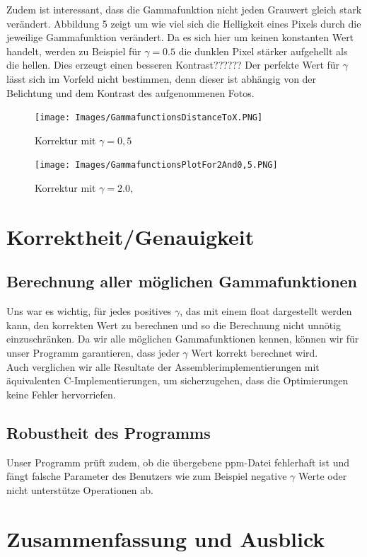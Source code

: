 \documentclass[course=erap]{aspdoc}
\begin{document}
	\noindent
	Zudem ist interessant, dass die Gammafunktion nicht jeden Grauwert gleich stark verändert. Abbildung 5 zeigt um wie viel sich die Helligkeit eines Pixels durch die jeweilige Gammafunktion verändert. Da es sich hier um keinen konstanten Wert handelt, werden zu Beispiel für $\gamma = 0.5$ die dunklen Pixel stärker aufgehellt als die hellen. Dies erzeugt einen besseren Kontrast??????
	\newline
	Der perfekte Wert für $\gamma$ lässt sich im Vorfeld nicht bestimmen, denn dieser ist abhängig von der Belichtung und dem Kontrast des aufgenommenen Fotos.
	\begin{figure}[h]
		\begin{minipage}{0.49\linewidth}
			\centering
			\texttt{[image: Images/GammafunctionsDistanceToX.PNG]}
			\caption{Korrektur mit $\gamma = 0,5$}
			\label{imageDistance}
		\end{minipage}
		\centering
		\begin{minipage}{0.49\linewidth}
			\centering
			\texttt{[image: Images/GammafunctionsPlotFor2And0,5.PNG]}
			\caption{Korrektur mit $\gamma = 2.0,$}
			\label{GammafunctionsPlot}
		\end{minipage}
	\end{figure}
	\section{Korrektheit/Genauigkeit}
	\subsection{Berechnung aller möglichen Gammafunktionen}
	Uns war es wichtig, für jedes positives $\gamma$, das mit einem float dargestellt werden kann, den korrekten Wert zu berechnen und so die Berechnung nicht unnötig einzuschränken. Da wir alle möglichen Gammafunktionen kennen, können wir für unser Programm garantieren, dass jeder $\gamma$ Wert korrekt berechnet wird. 
	\\
	Auch verglichen wir alle Resultate der Assemblerimplementierungen mit äquivalenten C-Implementierungen, um sicherzugehen, dass die Optimierungen keine Fehler hervorriefen.  
	\subsection{Robustheit des Programms}
	Unser Programm prüft zudem, ob die übergebene ppm-Datei fehlerhaft ist und fängt falsche Parameter des Benutzers wie zum Beispiel negative $\gamma$ Werte oder nicht unterstütze Operationen ab. 
		\section{Zusammenfassung und Ausblick}
	
	
	
	{}
	\printbibliography
\end{document}
